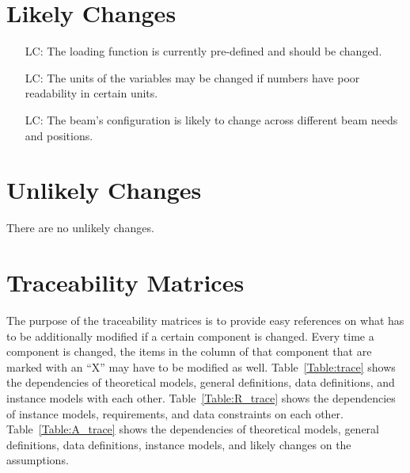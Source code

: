 \documentclass[12pt]{article}
\newcounter{lcnum} %
\begin{document}

\section{Likely Changes}

\noindent\begin{itemize}

    \item[LC\refstepcounter{lcnum}\thelcnum\label{LC_loading}:] The loading
        function is currently pre-defined and should be changed.

    \item[LC\refstepcounter{lcnum}\thelcnum\label{LC_units}:] The units of the
        variables may be changed if numbers have poor readability in certain
        units.

    \item[LC\refstepcounter{lcnum}\thelcnum\label{LC_beam_configuration}:] The
        beam's configuration is likely to change across different beam needs and
        positions.

\end{itemize}


\section{Unlikely Changes}

There are no unlikely changes.


\section{Traceability Matrices}

The purpose of the traceability matrices is to provide easy references on what
has to be additionally modified if a certain component is changed.  Every time a
component is changed, the items in the column of that component that are marked
with an ``X'' may have to be modified as well.  Table~\ref{Table:trace} shows
the dependencies of theoretical models, general definitions, data definitions,
and instance models with each other. Table~\ref{Table:R_trace} shows the
dependencies of instance models, requirements, and data constraints on each
other. Table~\ref{Table:A_trace} shows the dependencies of theoretical models,
general definitions, data definitions, instance models, and likely changes on
the assumptions.
\end{document}
